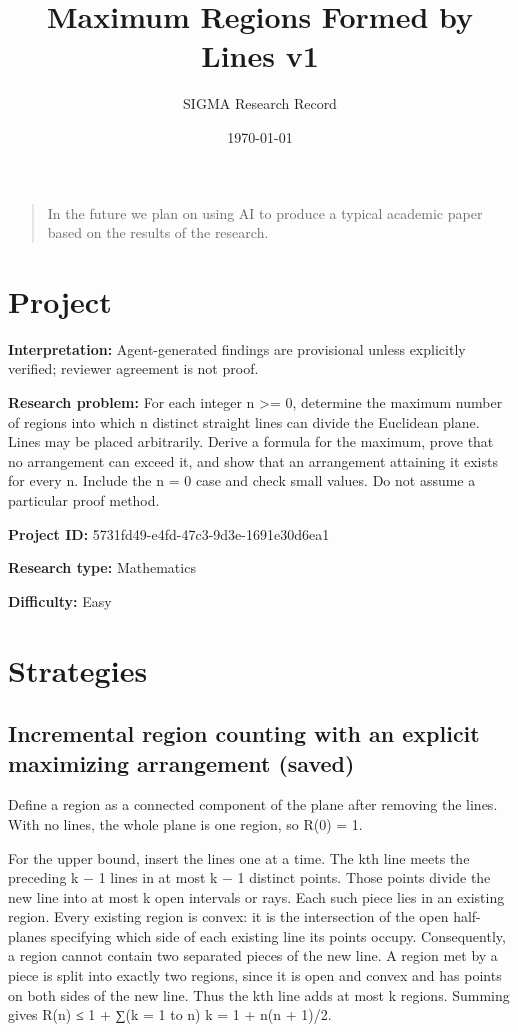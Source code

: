 \documentclass[11pt]{article}
\title{Maximum Regions Formed by Lines v1}
\author{SIGMA Research Record}
\date{\today}
\begin{document}
\maketitle
\begin{quote}\small In the future we plan on using AI to produce a typical academic paper based on the results of the research.\end{quote}
\section{Project}
\textbf{Interpretation:} Agent-generated findings are provisional unless explicitly verified; reviewer agreement is not proof.\par
\textbf{Research problem:} For each integer n \textgreater{}= 0, determine the maximum number of regions into which n distinct straight lines can divide the Euclidean plane. Lines may be placed arbitrarily. Derive a formula for the maximum, prove that no arrangement can exceed it, and show that an arrangement attaining it exists for every n. Include the n = 0 case and check small values. Do not assume a particular proof method.\par
\textbf{Project ID:} 5731fd49-e4fd-47c3-9d3e-1691e30d6ea1\par
\textbf{Research type:} Mathematics\par
\textbf{Difficulty:} Easy\par
\section{Strategies}
\subsection{Incremental region counting with an explicit maximizing arrangement (saved)}
Define a region as a connected component of the plane after removing the lines. With no lines, the whole plane is one region, so R(0) = 1.

For the upper bound, insert the lines one at a time. The kth line meets the preceding k − 1 lines in at most k − 1 distinct points. Those points divide the new line into at most k open intervals or rays. Each such piece lies in an existing region. Every existing region is convex: it is the intersection of the open half-planes specifying which side of each existing line its points occupy. Consequently, a region cannot contain two separated pieces of the new line. A region met by a piece is split into exactly two regions, since it is open and convex and has points on both sides of the new line. Thus the kth line adds at most k regions. Summing gives R(n) ≤ 1 + ∑(k = 1 to n) k = 1 + n(n + 1)/2.
\end{document}
